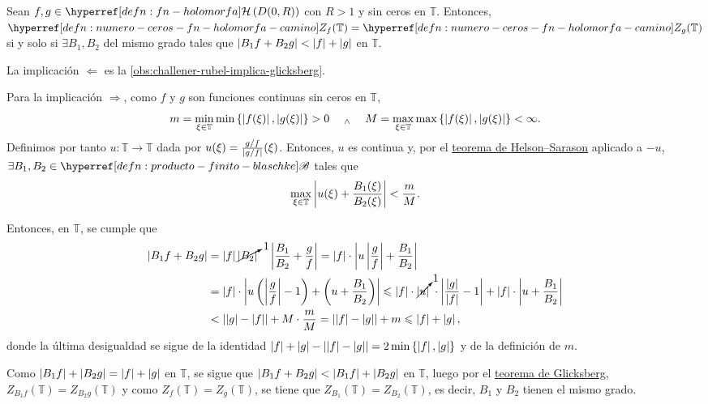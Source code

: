 \begin{teo}\label{teo:challener-rubel}
    Sean $f, g \in \exhyperref[defn:fn-holomorfa]{fn-holomorfa}{\mathcal{H}}\left(D(0,R)\right)$ con $R > 1$ y sin ceros en $\mathbb{T}$. Entonces, $\exhyperref[defn:numero-ceros-fn-holomorfa-camino]{numero-ceros-fn-holomorfa-camino}{Z_f}(\mathbb{T}) = \exhyperref[defn:numero-ceros-fn-holomorfa-camino]{numero-ceros-fn-holomorfa-camino}{Z_g}(\mathbb{T})$ si y solo si $\exists B_1, B_2$  del mismo grado tales que $\left|B_1 f + B_2 g\right| < \left|f\right| + \left|g\right|$ en $\mathbb{T}$.
\end{teo}
\begin{dem}
    La implicación $\boxed{\Leftarrow}$ es la \cref{obs:challener-rubel-implica-glicksberg}.

    Para la implicación $\boxed{\Rightarrow}$, como $f$ y $g$ son funciones continuas sin ceros en $\mathbb{T}$, 
    \[
    m = \min_{\xi \in \mathbb{T}} \min \left\{\left|f(\xi)\right|, \left|g(\xi)\right|\right\} > 0  \quad \; _{\wedge} \; \quad M = \max_{\xi \in \mathbb{T}} \max \left\{\left|f(\xi)\right|, \left|g(\xi)\right|\right\} < \infty.
    \]
    Definimos por tanto $u \colon \mathbb{T} \to \mathbb{T}$ dada por $u(\xi) = \frac{g/f}{\left|g/f\right|}(\xi)$. Entonces, $u$ es continua y, por el \hyperref[teo:helson-sarason-aproximacion-fn-unimodular-continua-cociente-prod-finito-blaschke]{teorema de Helson--Sarason} aplicado a $-u$, $\exists B_1, B_2 \in \exhyperref[defn:producto-finito-blaschke]{producto-finito-blaschke}{\mathscr{B}}$ tales que
    \[
    \max_{\xi \in \mathbb{T}} \left|u(\xi) + \frac{B_1(\xi)}{B_2(\xi)}\right| < \frac{m}{M}.
    \]

    Entonces, en $\mathbb{T}$, se cumple que
    \[
    \begin{aligned}
        \left|B_1 f + B_2 g\right| &= \left|f\right| \cancelto{1}{\left|B_2\right|}\quad \left|\frac{B_1}{B_2} + \frac{g}{f}\right| = \left|f\right| \cdot \left|u \left|\frac{g}{f}\right| + \frac{B_1}{B_2}\right| \\
        &= \left|f\right| \cdot \left|u \left(\left|\frac{g}{f}\right| -1\right) + \left(u + \frac{B_1}{B_2}\right)\right| \leqslant \left|f\right| \cdot \cancelto{1}{\left|u\right|}\; \cdot \left|\frac{\left|g\right|}{\left|f\right|} - 1\right| + \left|f\right| \cdot \left|u + \frac{B_1}{B_2}\right| \\
        &<  \left|\left|g\right| - \left|f\right|\right| + M \cdot \frac{m}{M} = \left|\left|f\right| - \left|g\right|\right| + m \leqslant \left|f\right| + \left|g\right|,
    \end{aligned}
    \]
    donde la última desigualdad se sigue de la identidad $\left|f\right| + \left|g\right| - \left|\left|f\right| - \left|g\right|\right| = 2 \min \left\{\left|f\right|, \left|g\right|\right\}$ y de la definición de $m$.

    Como $\left|B_1 f\right| + \left|B_2 g\right| = \left|f\right| + \left|g\right|$ en $\mathbb{T}$, se sigue que $\left|B_1 f + B_2 g\right| < \left|B_1 f\right| + \left|B_2 g\right|$ en $\mathbb{T}$, luego por el \hyperref[teo:glicksberg]{teorema de Glicksberg}, $Z_{B_1 f}(\mathbb{T}) = Z_{B_2 g}(\mathbb{T})$ y como $Z_{f} (\mathbb{T}) = Z_{g}(\mathbb{T})$, se tiene que $Z_{B_1}(\mathbb{T}) = Z_{B_2}(\mathbb{T})$, es decir, $B_1$ y $B_2$ tienen el mismo grado.\hfill\qedsymbol
\end{dem}